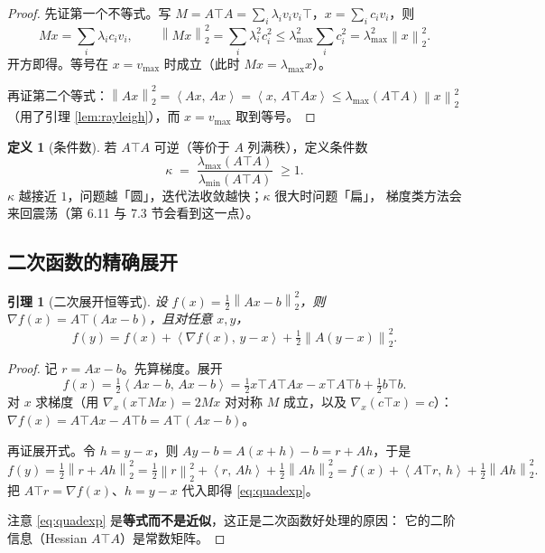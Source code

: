 \documentclass[11pt,a4paper,UTF8]{ctexart}
\theoremstyle{plain}
\newtheorem{lemma}[theorem]{引理}
\theoremstyle{definition}
\newtheorem{definition}[theorem]{定义}
\theoremstyle{remark}
\newcommand{\norm}[1]{\left\lVert #1 \right\rVert}
\newcommand{\inner}[2]{\left\langle #1,\, #2 \right\rangle}
\begin{document}
\begin{proof}
先证第一个不等式。写 $M=A\top A=\sum_i\lambda_iv_iv_i\top$，$x=\sum_ic_iv_i$，则
\[
Mx=\sum_i\lambda_ic_iv_i,\qquad
\norm{Mx}_2^2=\sum_i\lambda_i^2c_i^2\le\lambda_{\max}^2\sum_ic_i^2=\lambda_{\max}^2\norm{x}_2^2 .
\]
开方即得。等号在 $x=v_{\max}$ 时成立（此时 $Mx=\lambda_{\max}x$）。

再证第二个等式：$\norm{Ax}_2^2=\inner{Ax}{Ax}=\inner{x}{A\top Ax}\le\lambda_{\max}(A\top A)\norm{x}_2^2$
（用了引理 \ref{lem:rayleigh}），而 $x=v_{\max}$ 取到等号。
\end{proof}

\begin{definition}[条件数]
若 $A\top A$ 可逆（等价于 $A$ 列满秩），定义条件数
\[
\kappa \;=\;\frac{\lambda_{\max}(A\top A)}{\lambda_{\min}(A\top A)}\;\ge 1 .
\]
$\kappa$ 越接近 $1$，问题越「圆」，迭代法收敛越快；$\kappa$ 很大时问题「扁」，
梯度类方法会来回震荡（第 6.11 与 7.3 节会看到这一点）。
\end{definition}

\subsection{二次函数的精确展开}

\begin{lemma}[二次展开恒等式]\label{lem:quad}
设 $f(x)=\tfrac12\norm{Ax-b}_2^2$，则 $\nabla f(x)=A\top(Ax-b)$，且对任意 $x,y$，
\begin{equation}
f(y)=f(x)+\inner{\nabla f(x)}{y-x}+\tfrac12\norm{A(y-x)}_2^2 .
\label{eq:quadexp}
\end{equation}
\end{lemma}

\begin{proof}
记 $r=Ax-b$。先算梯度。展开
\[
f(x)=\tfrac12\inner{Ax-b}{Ax-b}=\tfrac12 x\top A\top Ax-x\top A\top b+\tfrac12 b\top b .
\]
对 $x$ 求梯度（用 $\nabla_x(x\top Mx)=2Mx$ 对对称 $M$ 成立，以及 $\nabla_x(c\top x)=c$）：
$\nabla f(x)=A\top Ax-A\top b=A\top(Ax-b)$。

再证展开式。令 $h=y-x$，则 $Ay-b=A(x+h)-b=r+Ah$，于是
\[
f(y)=\tfrac12\norm{r+Ah}_2^2
=\tfrac12\norm{r}_2^2+\inner{r}{Ah}+\tfrac12\norm{Ah}_2^2
=f(x)+\inner{A\top r}{h}+\tfrac12\norm{Ah}_2^2 .
\]
把 $A\top r=\nabla f(x)$、$h=y-x$ 代入即得 \eqref{eq:quadexp}。

注意 \eqref{eq:quadexp} 是\textbf{等式而不是近似}，这正是二次函数好处理的原因：
它的二阶信息（Hessian $A\top A$）是常数矩阵。
\end{proof}
\end{document}
